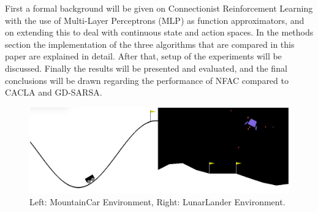 




First a formal background will be given on Connectionist Reinforcement Learning with the use of Multi-Layer Perceptrons (MLP) as function approximators, and on extending this to deal with continuous state and action spaces. In the methods section the implementation of the three algorithms that are compared in this paper are explained in detail. After that, setup of the experiments will be discussed. Finally the results will be presented and evaluated, and the final conclusions will be drawn regarding the performance of NFAC compared to CACLA and GD-SARSA.

\begin{figure}[t]
 \centering 
    \includegraphics[width = 0.7\columnwidth]{figs/mountainlunar.png}
 \caption{Left: MountainCar Environment, Right: LunarLander Environment.}
\label{fig:mountainlunar}
\end{figure}

